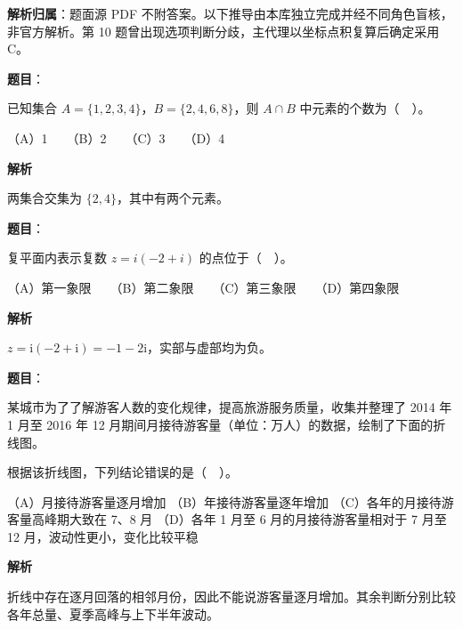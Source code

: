 

\begin{gknotice}
\textbf{解析归属}：题面源 PDF 不附答案。以下推导由本库独立完成并经不同角色盲核，非官方解析。第 10 题曾出现选项判断分歧，主代理以坐标点积复算后确定采用 C。
\end{gknotice}

\begin{answer}

\textbf{题目}：

已知集合 \(A=\{1,2,3,4\}\)，\(B=\{2,4,6,8\}\)，则 \(A\cap B\) 中元素的个数为（　）。

（A）1　　（B）2　　（C）3　　（D）4

\textbf{解析}

两集合交集为 \(\{2,4\}\)，其中有两个元素。


\end{answer}
\begin{answer}

\textbf{题目}：

复平面内表示复数 \(z=i(-2+i)\) 的点位于（　）。

（A）第一象限　　（B）第二象限　　（C）第三象限　　（D）第四象限

\textbf{解析}

\(z=\mathrm i(-2+\mathrm i)=-1-2\mathrm i\)，实部与虚部均为负。


\end{answer}
\begin{answer}

\textbf{题目}：

某城市为了了解游客人数的变化规律，提高旅游服务质量，收集并整理了 2014 年 1 月至 2016 年 12 月期间月接待游客量（单位：万人）的数据，绘制了下面的折线图。
\nopagebreak[4]
\begin{center}\end{center}
\nopagebreak[4]
根据该折线图，下列结论错误的是（　）。

（A）月接待游客量逐月增加
（B）年接待游客量逐年增加
（C）各年的月接待游客量高峰期大致在 7、8 月
（D）各年 1 月至 6 月的月接待游客量相对于 7 月至 12 月，波动性更小，变化比较平稳

\textbf{解析}

折线中存在逐月回落的相邻月份，因此不能说游客量逐月增加。其余判断分别比较各年总量、夏季高峰与上下半年波动。


\end{answer}
